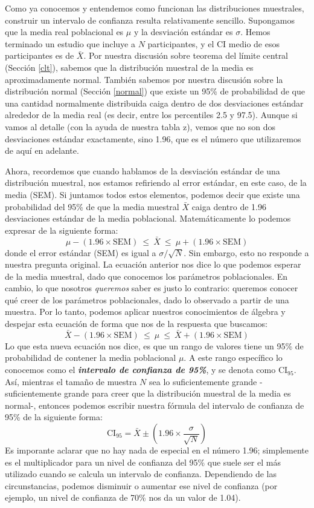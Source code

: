 \documentclass[spanish,]{book}
\begin{document}
Como ya conocemos y entendemos como funcionan las distribuciones
muestrales, construir un intervalo de confianza resulta relativamente
sencillo. Supongamos que la media real poblacional es \(\mu\) y la
desviación estándar es \(\sigma\). Hemos terminado un estudio que
incluye a \(N\) participantes, y el CI medio de esos participantes es de
\(\bar{X}\). Por nuestra discusión sobre teorema del límite central
(Sección \ref{clt}), sabemos que la distribución muestral de la media es
aproximadamente normal. También sabemos por nuestra discusión sobre la
distribución normal (Sección \ref{normal}) que existe un 95\% de
probabilidad de que una cantidad normalmente distribuida caiga dentro de
dos desviaciones estándar alrededor de la media real (es decir, entre
los percentiles 2.5 y 97.5). Aunque si vamos al detalle (con la ayuda de
nuestra tabla z), vemos que no son dos desviaciones estándar
exactamente, sino 1.96, que es el número que utilizaremos de aquí en
adelante.

Ahora, recordemos que cuando hablamos de la desviación estándar de una
distribución muestral, nos estamos refiriendo al error estándar, en este
caso, de la media (SEM). Si juntamos todos estos elementos, podemos
decir que existe una probabilidad del 95\% de que la media muestral
\(\bar{X}\) caiga dentro de 1.96 desviaciones estándar de la media
poblacional. Matemáticamente lo podemos expresar de la siguiente forma:
\[
\mu - \left( 1.96 \times \mbox{SEM} \right) \ \leq \  \bar{X}\  \leq \  \mu + \left( 1.96 \times \mbox{SEM} \right) 
\] donde el error estándar (SEM) es igual a \(\sigma / \sqrt{N}\). Sin
embargo, esto no responde a nuestra pregunta original. La ecuación
anterior nos dice lo que podemos esperar de la media muestral, dado que
conocemos los parámetros poblacionales. En cambio, lo que nosotros
\emph{queremos} saber es justo lo contrario: queremos conocer qué creer
de los parámetros poblacionales, dado lo observado a partir de una
muestra. Por lo tanto, podemos aplicar nuestros conocimientos de álgebra
y despejar esta ecuación de forma que nos de la respuesta que buscamos:
\[
\bar{X} -  \left( 1.96 \times \mbox{SEM} \right) \ \leq \ \mu  \ \leq  \ \bar{X} +  \left( 1.96 \times \mbox{SEM}\right)
\] Lo que esta nueva ecuación nos dice, es que un rango de valores tiene
un 95\% de probabilidad de contener la media poblacional \(\mu\). A este
rango específico lo conocemos como el \textbf{\emph{intervalo de
confianza de 95\%}}, y se denota como \(\mbox{CI}_{95}\). Así, mientras
el tamaño de muestra \(N\) sea lo suficientemente grande
-suficientemente grande para creer que la distribución muestral de la
media es normal-, entonces podemos escribir nuestra fórmula del
intervalo de confianza de 95\% de la siguiente forma: \[
\mbox{CI}_{95} = \bar{X} \pm \left( 1.96 \times \frac{\sigma}{\sqrt{N}} \right)
\] Es imporante aclarar que no hay nada de especial en el número 1.96;
simplemente es el multiplicador para un nivel de confianza del 95\% que
suele ser el más utilizado cuando se calcula un intervalo de confianza.
Dependiendo de las circunstancias, podemos disminuir o aumentar ese
nivel de confianza (por ejemplo, un nivel de confianza de 70\% nos da un
valor de 1.04).
\end{document}
